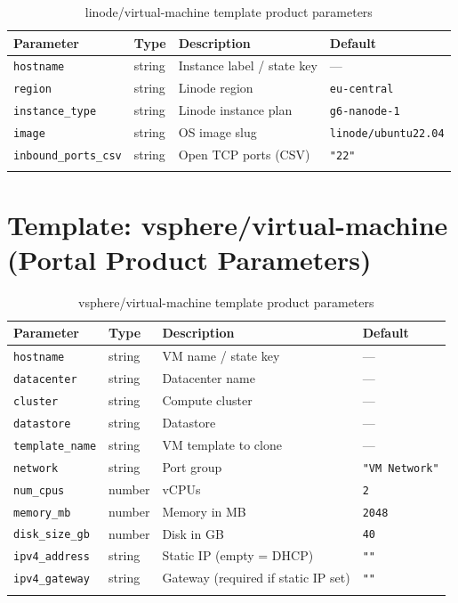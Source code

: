 \documentclass[12pt,a4paper,twoside]{report}
\newcommand{\code}[1]{\texttt{#1}}
\begin{document}
\begin{longtable}{@{}L{4.2cm}lL{5.3cm}l@{}}
  \toprule
  \textbf{Parameter} & \textbf{Type} & \textbf{Description} & \textbf{Default} \\
  \midrule
  \endhead
  \code{hostname}            & string & Instance label / state key         & — \\
  \code{region}              & string & Linode region                      & \code{eu-central} \\
  \code{instance\_type}      & string & Linode instance plan               & \code{g6-nanode-1} \\
  \code{image}               & string & OS image slug                      & \code{linode/ubuntu22.04} \\
  \code{inbound\_ports\_csv} & string & Open TCP ports (CSV)               & \code{"22"} \\
  \bottomrule
  \caption{linode/virtual-machine template product parameters}
\end{longtable}

\section{Template: vsphere/virtual-machine (Portal Product Parameters)}

\begin{longtable}{@{}L{4.2cm}lL{5.3cm}l@{}}
  \toprule
  \textbf{Parameter} & \textbf{Type} & \textbf{Description} & \textbf{Default} \\
  \midrule
  \endhead
  \code{hostname}        & string & VM name / state key                          & — \\
  \code{datacenter}      & string & Datacenter name                              & — \\
  \code{cluster}         & string & Compute cluster                              & — \\
  \code{datastore}       & string & Datastore                                    & — \\
  \code{template\_name}  & string & VM template to clone                         & — \\
  \code{network}         & string & Port group                                   & \code{"VM Network"} \\
  \code{num\_cpus}       & number & vCPUs                                        & \code{2} \\
  \code{memory\_mb}      & number & Memory in MB                                 & \code{2048} \\
  \code{disk\_size\_gb}  & number & Disk in GB                                   & \code{40} \\
  \code{ipv4\_address}   & string & Static IP (empty = DHCP)                     & \code{""} \\
  \code{ipv4\_gateway}   & string & Gateway (required if static IP set)          & \code{""} \\
  \bottomrule
  \caption{vsphere/virtual-machine template product parameters}
\end{longtable}
\end{document}

